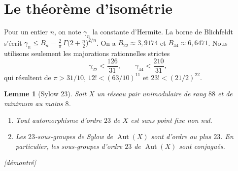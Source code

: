 \documentclass[11pt,a4paper]{amsart}
\theoremstyle{plain}
\newtheorem{lemme}[theoreme]{Lemme}
\theoremstyle{definition}
\numberwithin{equation}{section}
\DeclareMathOperator{\Aut}{Aut}
\newcommand{\st}[1]{\textup{\textsf{\small[#1]}}}
\newcommand{\DEM}{\st{démontré}}
\begin{document}
\section{Le théorème d'isométrie}\label{sec:isometrie}

Pour un entier $n$, on note $\gamma_n$ la constante d'Hermite. La borne de Blichfeldt~\cite{Bli29} s'écrit $\gamma_n\le B_n=\frac2\pi\,\Gamma\bigl(2+\frac n2\bigr)^{2/n}$. On a $B_{22}\approx3{,}9174$ et $B_{44}\approx6{,}6471$. Nous utilisons seulement les majorations rationnelles strictes
\begin{equation}\label{eq:blichfeldt}
\gamma_{22}<\frac{126}{31},\qquad \gamma_{44}<\frac{210}{31},
\end{equation}
qui résultent de $\pi>31/10$, $12!<(63/10)^{11}$ et $23!<(21/2)^{22}$.

\begin{lemme}[Sylow $23$]\label{lem:syl23}
Soit $X$ un réseau pair unimodulaire de rang $88$ et de minimum au moins $8$.
\begin{enumerate}[label=\textup{(\alph*)}]
\item Tout automorphisme d'ordre $23$ de $X$ est sans point fixe non nul.
\item Les $23$-sous-groupes de Sylow de $\Aut(X)$ sont d'ordre au plus $23$. En particulier, les sous-groupes d'ordre $23$ de $\Aut(X)$ sont conjugués.
\end{enumerate}
\DEM
\end{lemme}
\end{document}
